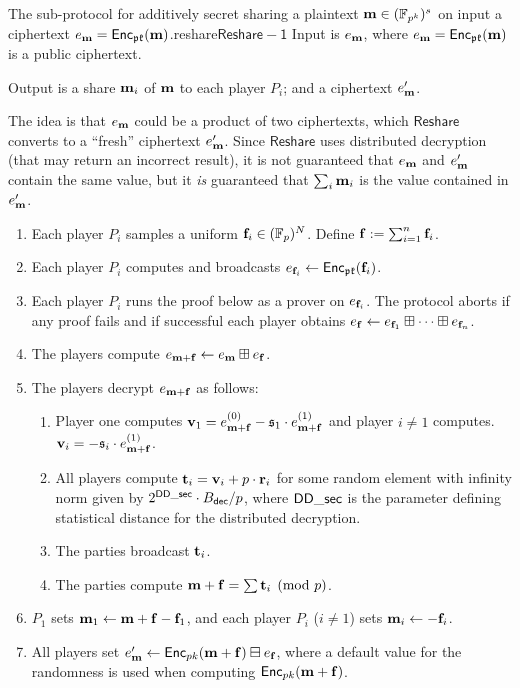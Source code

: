 \begin{Boxfig}{The sub-protocol for additively secret sharing a plaintext $\mathbf{m} \in ({\mathbb{F}}_{p^k})^s$ on input a ciphertext $e_{\mathbf{m}}=\mathsf{Enc}_{\mathfrak{pk}}(\mathbf{m})$.}{reshare}{$\mathsf{Reshare-1}$}
Input is $e_{\mathbf{m}}$, where $e_{\mathbf{m}}=\mathsf{Enc}_{\mathfrak{pk}}(\mathbf{m})$ is a public ciphertext.

Output is a share $\mathbf{m}_i$ of $\mathbf{m}$ to each player $P_i$; and a ciphertext $e'_{\mathbf{m}}$. 

The idea is that $e_{\mathbf{m}}$ could be a product of two ciphertexts, which
$\mathsf{Reshare}$ converts to a ``fresh'' ciphertext $e'_{\mathbf{m}}$. Since $\mathsf{Reshare}$ uses distributed decryption (that may return an incorrect result), it is not guaranteed that $e_{\mathbf{m}}$ and $e'_{\mathbf{m}}$ contain the same value, but it
{\em is} guaranteed that $\sum_i \mathbf{m}_i$ is the value contained in $e'_{\mathbf{m}}$.
\begin{enumerate}
\item Each player $P_i$ samples a uniform $\mathbf{f}_i\in ({\mathbb{F}}_p)^N$. Define $\mathbf{f}:=\sum_{i=1}^{n}\mathbf{f}_i$.
\item Each player $P_i$ computes and broadcasts $e_{\mathbf{f}_i}\leftarrow\mathsf{Enc}_{\mathfrak{pk}}(\mathbf{f}_i)$.\label{reshare:enc}
\item Each player $P_i$ runs the proof below as a prover on $e_{\mathbf{f}_i}$. The protocol aborts if any proof fails
and if successful each player obtains $e_{\mathbf{f}}\leftarrow e_{\mathbf{f}_1}\boxplus\dots\boxplus e_{\mathbf{f}_n}$.
\item The players compute $e_{\mathbf{m}+\mathbf{f}}\leftarrow e_{\mathbf{m}}\boxplus e_{\mathbf{f}}$.
\item The players decrypt $e_{\mathbf{m}+\mathbf{f}}$ as follows:
\begin{enumerate}
\item Player one computes $\mathbf{v}_1 = e_{\mathbf{m}+\mathbf{f}}^{(0)}-\mathfrak{s}_1 \cdot e_{\mathbf{m}+\mathbf{f}}^{(1)}$ and player $i \ne 1$ computes.
$\mathbf{v}_i = -\mathfrak{s}_i \cdot e_{\mathbf{m}+\mathbf{f}}^{(1)}$.
\item All players compute $\mathbf{t}_i = \mathbf{v}_i + p \cdot \mathbf{r}_i$ for some random element
with infinity norm given by $2^{\mathsf{DD\_sec}} \cdot B_{\mathsf{dec}}/p$, where $\mathsf{DD\_sec}$ is the parameter defining statistical distance for the distributed decryption.
\item The parties broadcast $\mathbf{t}_i$.
\item The parties compute $\mathbf{m}+\mathbf{f} = \sum \mathbf{t}_i \pmod{p}$.
\end{enumerate}
\item $P_1$ sets $\mathbf{m}_1\leftarrow \mathbf{m}+\mathbf{f}-\mathbf{f}_1$, and
each player $P_i$ ($i\neq 1$) sets $\mathbf{m}_i\leftarrow -\mathbf{f}_i$.
\item All players set $e'_{\mathbf{m}} \leftarrow \mathsf{Enc}_{pk}(\mathbf{m}+\mathbf{f})\boxminus e_{\mathbf{f}}$,
where a default value for the randomness is used when computing $\mathsf{Enc}_{pk}(\mathbf{m}+\mathbf{f})$.
\end{enumerate}
\end{Boxfig}


